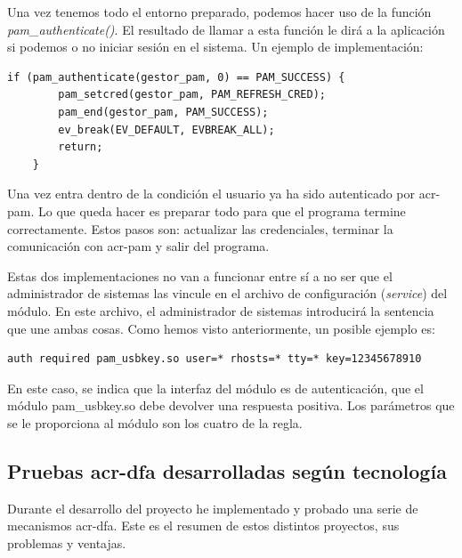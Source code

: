 \documentclass[twoside, titlepage, 12pt, a4paper]{article}
\begin{document}
{Una vez tenemos todo el entorno preparado, podemos hacer uso de la función \textit{pam\_authenticate()}. El resultado de llamar a esta función le dirá a la aplicación si podemos o no iniciar sesión en el sistema. Un ejemplo de implementación:
\begin{lstlisting}[xleftmargin=.07\textwidth]
    if (pam_authenticate(gestor_pam, 0) == PAM_SUCCESS) {
        pam_setcred(gestor_pam, PAM_REFRESH_CRED);
        pam_end(gestor_pam, PAM_SUCCESS);
        ev_break(EV_DEFAULT, EVBREAK_ALL);
        return;
    }
\end{lstlisting}
Una vez entra dentro de la condición el usuario ya ha sido autenticado por \gls{acr-pam}. Lo que queda hacer es preparar todo para que el programa termine correctamente. Estos pasos son: actualizar las credenciales, terminar la comunicación con \gls{acr-pam} y salir del programa.\par
Estas dos implementaciones no van a funcionar entre sí a no ser que el administrador de sistemas las vincule en el archivo de configuración (\textit{service}) del módulo. En este archivo, el administrador de sistemas introducirá la sentencia que une ambas cosas. Como hemos visto anteriormente, un posible ejemplo es:
\begin{lstlisting}
auth required pam_usbkey.so user=* rhosts=* tty=* key=12345678910
\end{lstlisting}
En este caso, se indica que la interfaz del módulo es de autenticación, que el módulo pam\_usbkey.so debe devolver una respuesta positiva. Los parámetros que se le proporciona al módulo son los cuatro de la regla.
\subsection{Pruebas \gls{acr-dfa} desarrolladas según tecnología}
Durante el desarrollo del proyecto he implementado y probado una serie de mecanismos \gls{acr-dfa}. Este es el resumen de estos distintos proyectos, sus problemas y ventajas.
}
\end{document}
